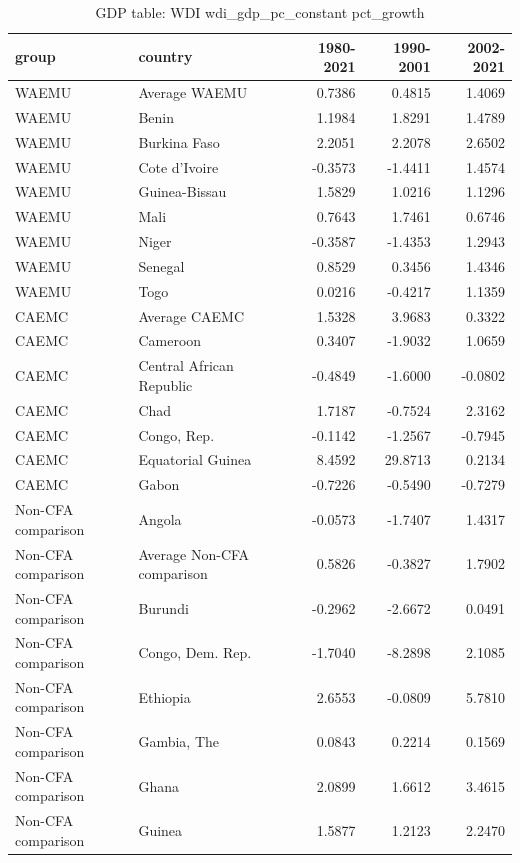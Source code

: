 \begin{table}

\caption{GDP table: WDI wdi_gdp_pc_constant pct_growth}
\centering
\begin{tabular}[t]{llrrr}
\toprule
group & country & 1980-2021 & 1990-2001 & 2002-2021\\
\midrule
WAEMU & Average WAEMU & 0.7386 & 0.4815 & 1.4069\\
WAEMU & Benin & 1.1984 & 1.8291 & 1.4789\\
WAEMU & Burkina Faso & 2.2051 & 2.2078 & 2.6502\\
WAEMU & Cote d'Ivoire & -0.3573 & -1.4411 & 1.4574\\
WAEMU & Guinea-Bissau & 1.5829 & 1.0216 & 1.1296\\
\addlinespace
WAEMU & Mali & 0.7643 & 1.7461 & 0.6746\\
WAEMU & Niger & -0.3587 & -1.4353 & 1.2943\\
WAEMU & Senegal & 0.8529 & 0.3456 & 1.4346\\
WAEMU & Togo & 0.0216 & -0.4217 & 1.1359\\
CAEMC & Average CAEMC & 1.5328 & 3.9683 & 0.3322\\
\addlinespace
CAEMC & Cameroon & 0.3407 & -1.9032 & 1.0659\\
CAEMC & Central African Republic & -0.4849 & -1.6000 & -0.0802\\
CAEMC & Chad & 1.7187 & -0.7524 & 2.3162\\
CAEMC & Congo, Rep. & -0.1142 & -1.2567 & -0.7945\\
CAEMC & Equatorial Guinea & 8.4592 & 29.8713 & 0.2134\\
\addlinespace
CAEMC & Gabon & -0.7226 & -0.5490 & -0.7279\\
Non-CFA comparison & Angola & -0.0573 & -1.7407 & 1.4317\\
Non-CFA comparison & Average Non-CFA comparison & 0.5826 & -0.3827 & 1.7902\\
Non-CFA comparison & Burundi & -0.2962 & -2.6672 & 0.0491\\
Non-CFA comparison & Congo, Dem. Rep. & -1.7040 & -8.2898 & 2.1085\\
\addlinespace
Non-CFA comparison & Ethiopia & 2.6553 & -0.0809 & 5.7810\\
Non-CFA comparison & Gambia, The & 0.0843 & 0.2214 & 0.1569\\
Non-CFA comparison & Ghana & 2.0899 & 1.6612 & 3.4615\\
Non-CFA comparison & Guinea & 1.5877 & 1.2123 & 2.2470\\

\end{tabular}
\end{table}
